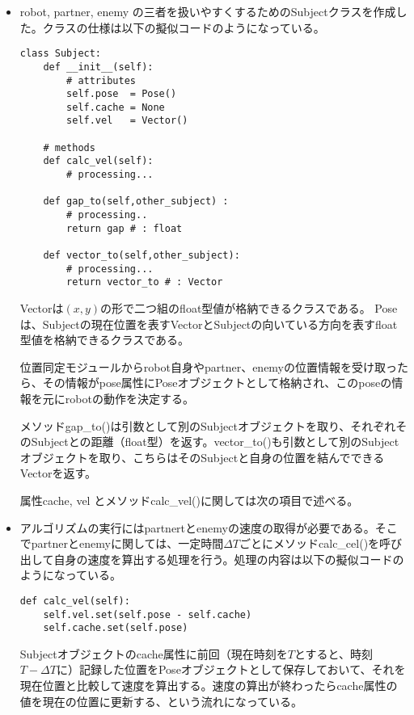 \documentclass{kuisthesis}
\begin{document}
\begin{itemize}
\item robot, partner, enemy の三者を扱いやすくするためのSubjectクラスを作成した。クラスの仕様は以下の擬似コードのようになっている。

\begin{lstlisting}
class Subject:
	def __init__(self):
		# attributes
		self.pose  = Pose()
		self.cache = None
		self.vel   = Vector()

	# methods
	def calc_vel(self):
		# processing...

	def gap_to(self,other_subject) :
		# processing..
		return gap # : float

	def vector_to(self,other_subject):
		# processing...
		return vector_to # : Vector
\end{lstlisting}

Vectorは$(x,y)$の形で二つ組のfloat型値が格納できるクラスである。
Poseは、Subjectの現在位置を表すVectorとSubjectの向いている方向を表すfloat型値を格納できるクラスである。

位置同定モジュールからrobot自身やpartner、enemyの位置情報を受け取ったら、その情報がpose属性にPoseオブジェクトとして格納され、このposeの情報を元にrobotの動作を決定する。

メソッドgap\_to()は引数として別のSubjectオブジェクトを取り、それぞれそのSubjectとの距離（float型）を返す。vector\_to()も引数として別のSubjectオブジェクトを取り、こちらはそのSubjectと自身の位置を結んでできるVectorを返す。

属性cache, vel とメソッドcalc\_vel()に関しては次の項目で述べる。

\vspace{1.0em}

\item アルゴリズムの実行にはpartnertとenemyの速度の取得が必要である。そこでpartnerとenemyに関しては、一定時間$\Delta T$ごとにメソッドcalc\_cel()を呼び出して自身の速度を算出する処理を行う。処理の内容は以下の擬似コードのようになっている。

\begin{lstlisting}
def calc_vel(self):
	self.vel.set(self.pose - self.cache)
	self.cache.set(self.pose)
\end{lstlisting}

Subjectオブジェクトのcache属性に前回（現在時刻を$T$とすると、時刻$T - \Delta T$に）記録した位置をPoseオブジェクトとして保存しておいて、それを現在位置と比較して速度を算出する。速度の算出が終わったらcache属性の値を現在の位置に更新する、という流れになっている。


\end{itemize}
\end{document}
